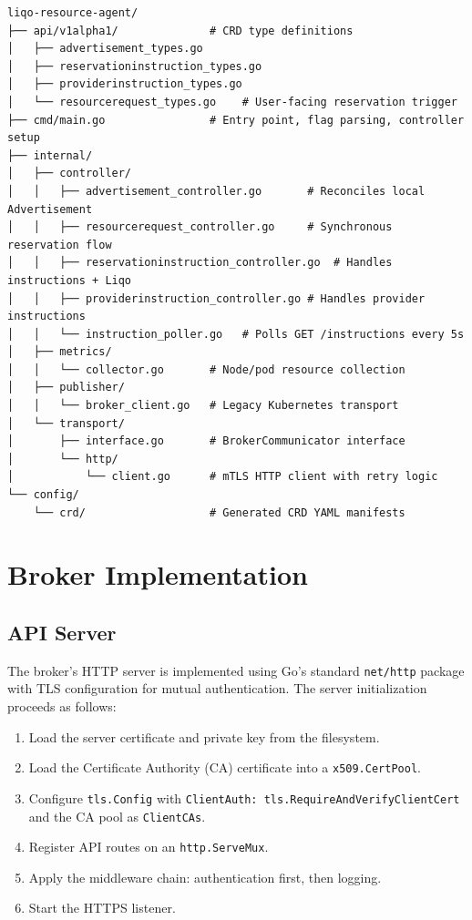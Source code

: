 \begin{verbatim}
liqo-resource-agent/
├── api/v1alpha1/              # CRD type definitions
│   ├── advertisement_types.go
│   ├── reservationinstruction_types.go
│   ├── providerinstruction_types.go
│   └── resourcerequest_types.go    # User-facing reservation trigger
├── cmd/main.go                # Entry point, flag parsing, controller setup
├── internal/
│   ├── controller/
│   │   ├── advertisement_controller.go       # Reconciles local Advertisement
│   │   ├── resourcerequest_controller.go     # Synchronous reservation flow
│   │   ├── reservationinstruction_controller.go  # Handles instructions + Liqo
│   │   ├── providerinstruction_controller.go # Handles provider instructions
│   │   └── instruction_poller.go   # Polls GET /instructions every 5s
│   ├── metrics/
│   │   └── collector.go       # Node/pod resource collection
│   ├── publisher/
│   │   └── broker_client.go   # Legacy Kubernetes transport
│   └── transport/
│       ├── interface.go       # BrokerCommunicator interface
│       └── http/
│           └── client.go      # mTLS HTTP client with retry logic
└── config/
    └── crd/                   # Generated CRD YAML manifests
\end{verbatim}


\section{Broker Implementation}
\label{sec:broker-impl}

\subsection{API Server}
\label{subsec:api-server}

The broker's HTTP server is implemented using Go's standard \texttt{net/http} package with TLS configuration for mutual authentication. The server initialization proceeds as follows:

\begin{enumerate}
    \item Load the server certificate and private key from the filesystem.
    \item Load the Certificate Authority (CA) certificate into a \texttt{x509.CertPool}.
    \item Configure \texttt{tls.Config} with \texttt{ClientAuth: tls.RequireAndVerifyClientCert} and the CA pool as \texttt{ClientCAs}.
    \item Register API routes on an \texttt{http.ServeMux}.
    \item Apply the middleware chain: authentication first, then logging.
    \item Start the HTTPS listener.
\end{enumerate}

